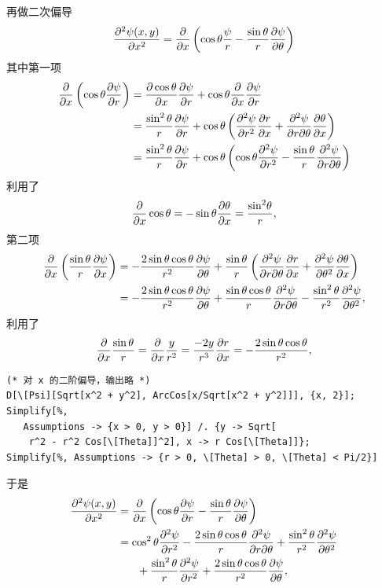 再做二次偏导
\begin{align}
    \pdv[2]{\psi(x,y)}{x} = \pdv{x} \left(\cos\theta \frac{\psi}r - \frac{\sin\theta}r \pdv{\psi}{\theta}\right)
    \label{eq:polar_2nd_derv}
\end{align}
其中第一项
\begin{align}
    \pdv{x} \left(\cos\theta\pdv{\psi}{r}\right) 
    &= \pdv{\cos\theta}{x}\pdv{\psi}{r} + \cos\theta \pdv{x} \pdv{\psi}{r} \\
    &=\frac{\sin^2\theta}{r} \pdv{\psi}{r} + \cos\theta \left(\pdv[2]{\psi}{r} \pdv{r}{x} + \pdv[2]{\psi}{r}{\theta} \pdv{\theta}{x}\right) \\
    & = \frac{\sin^2\theta}{r} \pdv{\psi}{r} + \cos\theta \left( \cos\theta \pdv[2]{\psi}{r} - \frac{\sin\theta}{r} \pdv[2]{\psi}{r}{\theta}\right)
\end{align}
利用了
\begin{align}
    \pdv{x} \cos\theta = - \sin\theta \pdv{\theta}{x} = \frac{\sin^2\!\theta}{r},
\end{align}
第二项
\begin{align}
    \pdv{x} \left(\frac{\sin\theta}{r}\pdv{\psi}{x}\right) 
    &= - \frac{2\sin\theta \cos\theta}{r^2} \pdv{\psi}{\theta} + \frac{\sin\theta}r \left(\pdv[2]{\psi}{r}{\theta} \pdv{r}{x} + \pdv[2]{\psi}{\theta} \pdv{\theta}{x}\right)\\
    &=- \frac{2\sin\theta\cos\theta}{r^2} \pdv{\psi}{\theta} + \frac{\sin\theta \cos\theta}{r} \pdv[2]{\psi}{r}{\theta} - \frac{\sin^2\theta}{r^2} \pdv[2]{\psi}{\theta},
\end{align}
利用了
\begin{align}
    \pdv{x} \frac{\sin\theta}{r} = \pdv{x} \frac{y}{r^2} = \frac{-2y}{r^3} \pdv{r}{x} = -\frac{2\sin\theta\cos\theta}{r^2},
\end{align}
\begin{lstlisting}
(* 对 x 的二阶偏导，输出略 *)
D[\[Psi][Sqrt[x^2 + y^2], ArcCos[x/Sqrt[x^2 + y^2]]], {x, 2}];
Simplify[%, 
   Assumptions -> {x > 0, y > 0}] /. {y -> Sqrt[
    r^2 - r^2 Cos[\[Theta]]^2], x -> r Cos[\[Theta]]};
Simplify[%, Assumptions -> {r > 0, \[Theta] > 0, \[Theta] < Pi/2}]
\end{lstlisting}
于是
\begin{align}
    \pdv[2]{\psi(x,y)}{x}     
    &= \pdv{x} 
    \left(\cos\theta \pdv{\psi}{r} - \frac{\sin\theta}{r} \pdv{\psi}{\theta}\right) \\
    &= \cos^2\theta \pdv[2]{\psi}{r} - \frac{2\sin\theta\cos\theta}{r} \pdv[2]{\psi}{r}{\theta} + \frac{\sin^2\theta}{r^2} \pdv[2]{\psi}{\theta} \notag \\
    &\phantom{=} \quad + \frac{\sin^2\theta}{r} \pdv[2]{\psi}{r} + \frac{2\sin\theta\cos\theta}{r^2} \pdv{\psi}{\theta},
\end{align}
